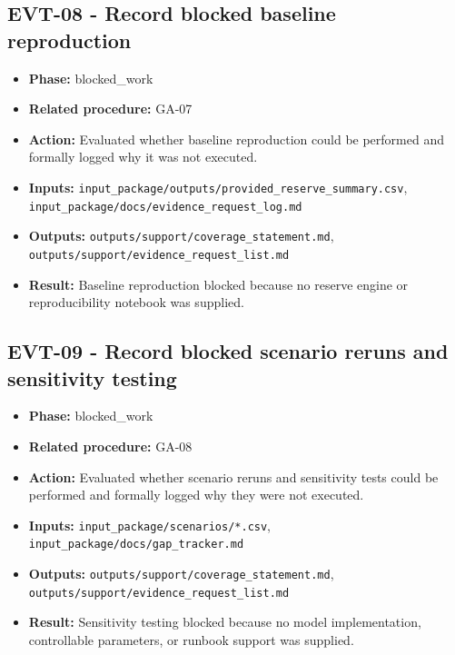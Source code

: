 \documentclass[11pt]{article}
\begin{document}
\subsection*{EVT-08 - Record blocked baseline reproduction}
\begin{itemize}
\item \textbf{Phase:} blocked\_work
\item \textbf{Related procedure:} GA-07
\item \textbf{Action:} Evaluated whether baseline reproduction could be performed and formally logged why it was not executed.
\item \textbf{Inputs:} \texttt{input\_package/outputs/provided\_reserve\_summary.csv}, \texttt{input\_package/docs/evidence\_request\_log.md}
\item \textbf{Outputs:} \texttt{outputs/support/coverage\_statement.md}, \texttt{outputs/support/evidence\_request\_list.md}
\item \textbf{Result:} Baseline reproduction blocked because no reserve engine or reproducibility notebook was supplied.
\end{itemize}
\subsection*{EVT-09 - Record blocked scenario reruns and sensitivity testing}
\begin{itemize}
\item \textbf{Phase:} blocked\_work
\item \textbf{Related procedure:} GA-08
\item \textbf{Action:} Evaluated whether scenario reruns and sensitivity tests could be performed and formally logged why they were not executed.
\item \textbf{Inputs:} \texttt{input\_package/scenarios/*.csv}, \texttt{input\_package/docs/gap\_tracker.md}
\item \textbf{Outputs:} \texttt{outputs/support/coverage\_statement.md}, \texttt{outputs/support/evidence\_request\_list.md}
\item \textbf{Result:} Sensitivity testing blocked because no model implementation, controllable parameters, or runbook support was supplied.
\end{itemize}
\end{document}
